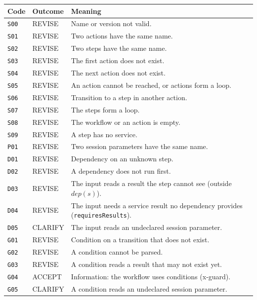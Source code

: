 \documentclass[a4paper]{arrowhead}
\begin{document}
{\small
\begin{longtable}{|p{1.3cm}|p{1.9cm}|p{12.8cm}|}

\hline
\rowcolor{gray!33} Code & Outcome & Meaning \\ \hline
\endhead
\texttt{S00} & REVISE & Name or version not valid. \\ \hline
\texttt{S01} & REVISE & Two actions have the same name. \\ \hline
\texttt{S02} & REVISE & Two steps have the same name. \\ \hline
\texttt{S03} & REVISE & The first action does not exist. \\ \hline
\texttt{S04} & REVISE & The next action does not exist. \\ \hline
\texttt{S05} & REVISE & An action cannot be reached, or actions form a loop. \\ \hline
\texttt{S06} & REVISE & Transition to a step in another action. \\ \hline
\texttt{S07} & REVISE & The steps form a loop. \\ \hline
\texttt{S08} & REVISE & The workflow or an action is empty. \\ \hline
\texttt{S09} & REVISE & A step has no service. \\ \hline
\texttt{P01} & REVISE & Two session parameters have the same name. \\ \hline
\texttt{D01} & REVISE & Dependency on an unknown step. \\ \hline
\texttt{D02} & REVISE & A dependency does not run first. \\ \hline
\texttt{D03} & REVISE & The input reads a result the step cannot see (outside $dep(s)$). \\ \hline
\texttt{D04} & REVISE & The input needs a service result no dependency provides (\texttt{requiresResults}). \\ \hline
\texttt{D05} & CLARIFY & The input reads an undeclared session parameter. \\ \hline
\texttt{G01} & REVISE & Condition on a transition that does not exist. \\ \hline
\texttt{G02} & REVISE & A condition cannot be parsed. \\ \hline
\texttt{G03} & REVISE & A condition reads a result that may not exist yet. \\ \hline
\texttt{G04} & ACCEPT & Information: the workflow uses conditions (x-guard). \\ \hline
\texttt{G05} & CLARIFY & A condition reads an undeclared session parameter. \\ \hline

\end{longtable}}
\end{document}
